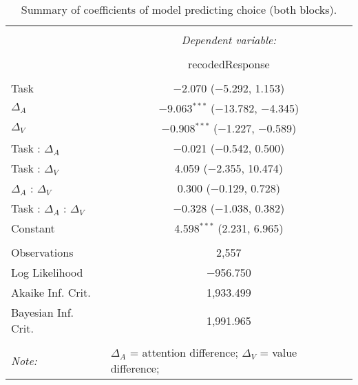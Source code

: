 
\begin{table}[!b] \centering 
  \caption{Summary of coefficients of model predicting choice (both blocks).} 
  \label{table:choiceModelAll} 
\begin{tabular}{@{\extracolsep{5pt}}lc} 
\\[-1.8ex]\hline 
\hline \\[-1.8ex] 
 & \multicolumn{1}{c}{\textit{Dependent variable:}} \\ 
\cline{2-2} 
\\[-1.8ex] & recodedResponse \\ 
\hline \\[-1.8ex] 
 Task & $-$2.070 ($-$5.292, 1.153) \\ 
  $\Delta_A$ & $-$9.063$^{***}$ ($-$13.782, $-$4.345) \\ 
  $\Delta_V$ & $-$0.908$^{***}$ ($-$1.227, $-$0.589) \\ 
  Task : $\Delta_A$ & $-$0.021 ($-$0.542, 0.500) \\ 
  Task : $\Delta_V$ & 4.059 ($-$2.355, 10.474) \\ 
  $\Delta_A$ : $\Delta_V$ & 0.300 ($-$0.129, 0.728) \\ 
  Task : $\Delta_A$ :  $\Delta_V$ & $-$0.328 ($-$1.038, 0.382) \\ 
  Constant & 4.598$^{***}$ (2.231, 6.965) \\ 
 \hline \\[-1.8ex] 
Observations & 2,557 \\ 
Log Likelihood & $-$956.750 \\ 
Akaike Inf. Crit. & 1,933.499 \\ 
Bayesian Inf. Crit. & 1,991.965 \\ 
\hline 
\hline \\[-1.8ex] 
\textit{Note:}  & \multicolumn{1}{l}{\footnotesize $\Delta_A$ = attention difference; $\Delta_V$ = value difference; } \\ 
\end{tabular} 
\end{table} 
